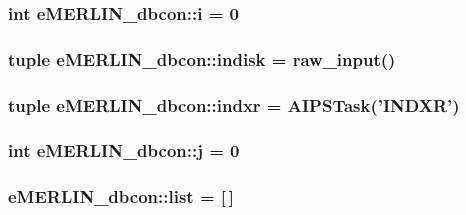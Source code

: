 \hypertarget{namespacee_m_e_r_l_i_n__dbcon_a02dbe30556487e3ce9717f700e863dd7}{
\subsubsection[{i}]{\setlength{\rightskip}{0pt plus 5cm}int {\bf e\-M\-E\-R\-L\-I\-N\-\_\-dbcon\-::i} = 0}}\label{namespacee_m_e_r_l_i_n__dbcon_a02dbe30556487e3ce9717f700e863dd7}
\hypertarget{namespacee_m_e_r_l_i_n__dbcon_a3b3d57aefde6e9d540ecb3801fac5664}{
\subsubsection[{indisk}]{\setlength{\rightskip}{0pt plus 5cm}tuple {\bf e\-M\-E\-R\-L\-I\-N\-\_\-dbcon\-::indisk} = raw\-\_\-input()}}\label{namespacee_m_e_r_l_i_n__dbcon_a3b3d57aefde6e9d540ecb3801fac5664}
\hypertarget{namespacee_m_e_r_l_i_n__dbcon_a306e8762b0925929428f0264f23a6674}{
\subsubsection[{indxr}]{\setlength{\rightskip}{0pt plus 5cm}tuple {\bf e\-M\-E\-R\-L\-I\-N\-\_\-dbcon\-::indxr} = \-A\-I\-P\-S\-Task('\-I\-N\-D\-X\-R')}}\label{namespacee_m_e_r_l_i_n__dbcon_a306e8762b0925929428f0264f23a6674}
\hypertarget{namespacee_m_e_r_l_i_n__dbcon_a62b3c7f92b7b6c06d24b9c76e31aa4e7}{
\subsubsection[{j}]{\setlength{\rightskip}{0pt plus 5cm}int {\bf e\-M\-E\-R\-L\-I\-N\-\_\-dbcon\-::j} = 0}}\label{namespacee_m_e_r_l_i_n__dbcon_a62b3c7f92b7b6c06d24b9c76e31aa4e7}
\hypertarget{namespacee_m_e_r_l_i_n__dbcon_ab058e469d8921bc98b806969ffd1e2a2}{
\subsubsection[{list}]{ {\bf e\-M\-E\-R\-L\-I\-N\-\_\-dbcon\-::list} = \mbox{[}$\,$\mbox{]}}}\label{namespacee_m_e_r_l_i_n__dbcon_ab058e469d8921bc98b806969ffd1e2a2}
